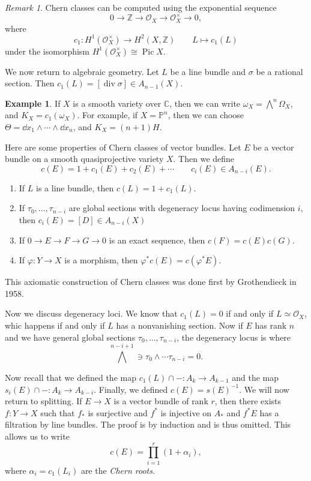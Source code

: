 \documentclass[leqno, openany]{memoir}
\theoremstyle{definition}
\newtheorem{exm}[thm]{Example}
\theoremstyle{remark}
\newtheorem{rmk}[thm]{Remark}
\theoremstyle{plain}
\theoremstyle{definition}
\theoremstyle{remark}
\newcommand{\C}{\mathbb{C}}
\newcommand{\Z}{\mathbb{Z}}
\renewcommand{\P}{\mathbb{P}}
\newcommand{\msc}[1]{\mathscr{#1}}
\renewcommand{\div}{\operatorname{div}}
\DeclareMathOperator{\Pic}{Pic}
\begin{document}
\begin{rmk}
    Chern classes can be computed using the exponential sequence 
    \[ 0 \to \Z \to \msc{O}_X \to \msc{O}_X^{\times} \to 0, \] 
    where
    \[ c_1 \colon H^1(\msc{O}_X^{\times}) \to H^2(X, \Z) \qquad L \mapsto c_1(L) \]
    under the isomorphism $H^1(\msc{O}_X^{\times}) \cong \Pic X$.
\end{rmk}

We now return to algebraic geometry. Let $L$ be a line bundle and $\sigma$ be a rational section. Then $c_1(L) = [\div \sigma] \in A_{n-1}(X)$.

\begin{exm}
    If $X$ is a smooth variety over $\C$, then we can write $\omega_X = \bigwedge^n \Omega_X$, and $K_X = c_1(\omega_X)$. For example, if $X = \P^n$, then we can choose $\Theta = \dd{x_1} \wedge \cdots \wedge \dd{x_n}$, and $K_X = (n+1)H$.
\end{exm}

Here are some properties of Chern classes of vector bundles. Let $E$ be a vector bundle on a smooth quasiprojective variety $X$. Then we define
\[ c(E) = 1 + c_1(E) + c_2(E) + \cdots \qquad c_i(E) \in A_{n-i}(E). \]
\begin{enumerate}
    \item If $L$ is a line bundle, then $c(L) = 1 + c_1(L)$.
    \item If $\tau_0, \ldots, \tau_{n-i}$ are global sections with degeneracy locus having codimension $i$, then $c_i(E) = [D] \in A_{n-i}(X)$
    \item If $0 \to E \to F \to G \to 0$ is an exact sequence, then $c(F) = c(E) c(G)$.
    \item If $\varphi \colon Y \to X$ is a morphism, then $\varphi^* c(E) = c(\varphi^* E)$.
\end{enumerate}
This axiomatic construction of Chern classes was done first by Grothendieck in 1958.

Now we discuss degeneracy loci. We know that $c_1(L) = 0$ if and only if $L \simeq \msc{O}_X$, whic happens if and only if $L$ has a nonvanishing section. Now if $E$ has rank $n$ and we have general global sections $\tau_0, \ldots, \tau_{n-i}$, the degeneracy locus is where
\[ {\bigwedge}^{n-i+1} \ni \tau_0 \wedge \cdots \tau_{n-i} = 0. \]

Now recall that we defined the map $c_1(L) \cap - \colon A_k \to A_{k-1}$ and the map $s_i(E) \cap - \colon A_k \to A_{k-i}$. Finally, we defined $c(E) = {s(E)}^{-1}$. We will now return to splitting. If $E \to X$ is a vector bundle of rank $r$, then there exists $f \colon Y \to X$ such that $f_*$ is surjective and $f^*$ is injective on $A_*$ and $f^* E$ has a filtration by line bundles. The proof is by induction and is thus omitted. This allows us to write 
\[ c(E) = \prod_{i=1}^r (1 + \alpha_i), \]
where $\alpha_i = c_1(L_i)$ are the \textit{Chern roots}.
\end{document}
